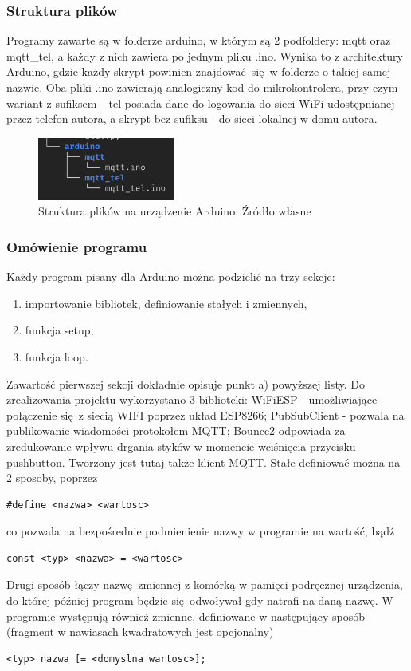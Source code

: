 \documentclass[12pt,twoside,polish]{article}
\begin{document}
\subsubsection*{Struktura plików}

Programy zawarte są w folderze arduino, w którym są 2 podfoldery: mqtt oraz mqtt\_tel, a każdy z nich zawiera po jednym pliku .ino. Wynika to z architektury Arduino, gdzie każdy skrypt powinien znajdować się w folderze o takiej samej nazwie. Oba pliki .ino zawierają analogiczny kod do mikrokontrolera, przy czym wariant z sufiksem \_tel posiada dane do logowania do sieci WiFi udostępnianej przez telefon autora, a skrypt bez sufiksu - do sieci lokalnej w domu autora.

\begin{figure}[h]
	\centering	
	\includegraphics[width=0.4\textwidth]{dirs_arduino}
	\caption{Struktura plików na urządzenie Arduino. Źródło własne}
\end{figure}

\subsubsection*{Omówienie programu}
Każdy program pisany dla Arduino można podzielić na trzy sekcje:
\begin{enumerate}[label=\alph*), leftmargin=1.25cm]
	\item importowanie bibliotek, definiowanie stałych i zmiennych,
	\item funkcja setup,
	\item funkcja loop.
\end{enumerate}

Zawartość pierwszej sekcji dokładnie opisuje punkt a) powyższej listy. Do zrealizowania projektu wykorzystano 3 biblioteki: WiFiESP - umożliwiające połączenie się z siecią WIFI poprzez układ ESP8266; PubSubClient - pozwala na publikowanie wiadomości protokołem MQTT; Bounce2 odpowiada za zredukowanie wpływu drgania styków w momencie wciśnięcia przycisku pushbutton. Tworzony jest tutaj także klient MQTT. Stałe definiować można na 2 sposoby, poprzez
\begin{lstlisting}
#define <nazwa> <wartosc>
\end{lstlisting}
co pozwala na bezpośrednie podmienienie nazwy w programie na wartość, bądź
\begin{lstlisting}
const <typ> <nazwa> = <wartosc>
\end{lstlisting}
Drugi sposób łączy nazwę zmiennej z komórką w pamięci podręcznej urządzenia, do której później program będzie się odwoływał gdy natrafi na daną nazwę. W programie występują również zmienne, definiowane w następujący sposób (fragment w nawiasach kwadratowych jest opcjonalny)
\begin{lstlisting}
<typ> nazwa [= <domyslna wartosc>];
\end{lstlisting}
\end{document}
